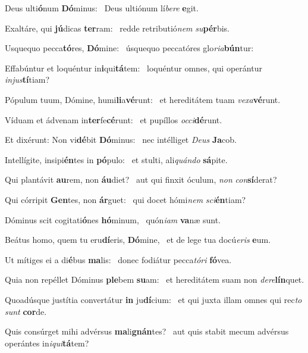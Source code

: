 \item Deus ulti\textbf{ó}num \textbf{Dó}minus:~\psstar{} Deus ultiónum lí\textit{be}\textit{re} \textbf{e}git.
\item Exaltáre, qui \textbf{jú}dicas \textbf{ter}ram:~\psstar{} redde retributió\textit{nem} \textit{su}\textbf{pér}bis.
\item Usquequo pecca\textbf{tó}res, \textbf{Dó}mine:~\psstar{} úsquequo peccatóres glo\textit{ri}\textit{a}\textbf{bún}tur:
\item Effabúntur et loquéntur in\textbf{i}qui\textbf{tá}tem:~\psstar{} loquéntur omnes, qui operántur \textit{in}\textit{jus}\textbf{tí}tiam?
\item Pópulum tuum, Dómine, humi\textbf{li}a\textbf{vé}runt:~\psstar{} et hereditátem tuam \textit{ve}\textit{xa}\textbf{vé}runt.
\item Víduam et ádvenam in\textbf{ter}fe\-\textbf{cé}runt:~\psstar{} et pupíllos \textit{oc}\textit{ci}\textbf{dé}runt.
\item Et dixérunt: Non vi\textbf{dé}bit \textbf{Dó}minus:~\psstar{} nec intélliget \textit{De}\textit{us} \textbf{Ja}cob.
\item Intellígite, insipi\textbf{én}tes in \textbf{pó}pulo:~\psstar{} et stulti, ali\textit{quán}\textit{do} \textbf{sá}pite.
\item Qui plantávit \textbf{au}rem, non \textbf{áu}diet?~\psstar{} aut qui finxit óculum, \textit{non} \textit{con}\textbf{sí}derat?
\item Qui córripit \textbf{Gen}tes, non \textbf{ár}guet:~\psstar{} qui docet hómi\textit{nem} \textit{sci}\textbf{én}tiam?
\item Dóminus scit cogitati\textbf{ó}nes \textbf{hó}minum,~\psstar{} quón\textit{i}\textit{am} \textbf{va}næ sunt.
\item Beátus homo, quem tu eru\textbf{dí}eris, \textbf{Dó}mine,~\psstar{} et de lege tua docú\textit{e}\textit{ris} \textbf{e}um.
\item Ut mítiges ei a di\textbf{é}bus \textbf{ma}lis:~\psstar{} donec fodiátur pecca\textit{tó}\textit{ri} \textbf{fó}vea.
\item Quia non repéllet Dóminus \textbf{ple}bem \textbf{su}am:~\psstar{} et hereditátem suam non \textit{de}\textit{re}\textbf{lín}quet.
\item Quoadúsque justítia convertátur \textbf{in} ju\textbf{dí}cium:~\psstar{} et qui juxta illam omnes qui rec\textit{to} \textit{sunt} \textbf{cor}de.
\item Quis consúrget mihi advérsus \textbf{ma}li\textbf{gnán}tes?~\psstar{} aut quis stabit mecum advérsus operántes in\textit{i}\textit{qui}\textbf{tá}tem?
